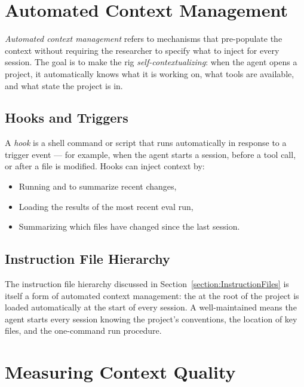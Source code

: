 \section{Automated Context Management}
\label{section:AutomatedContext}

\emph{Automated context management} refers to mechanisms that pre-populate the context without requiring the researcher to specify what to inject for every session.
The goal is to make the rig \emph{self-contextualizing}: when the agent opens a project, it automatically knows what it is working on, what tools are available, and what state the project is in.

\subsection{Hooks and Triggers}

A \emph{hook} is a shell command or script that runs automatically in response to a trigger event — for example, when the agent starts a session, before a tool call, or after a file is modified.
Hooks can inject context by:
\begin{itemize}
\item Running  and  to summarize recent changes,
\item Loading the results of the most recent eval run,
\item Summarizing which files have changed since the last session.
\end{itemize}

\subsection{Instruction File Hierarchy}

The instruction file hierarchy discussed in Section~\ref{section:InstructionFiles} is itself a form of automated context management: the  at the root of the project is loaded automatically at the start of every session.
A well-maintained  means the agent starts every session knowing the project's conventions, the location of key files, and the one-command run procedure.

\section{Measuring Context Quality}
\label{section:ContextQuality}

